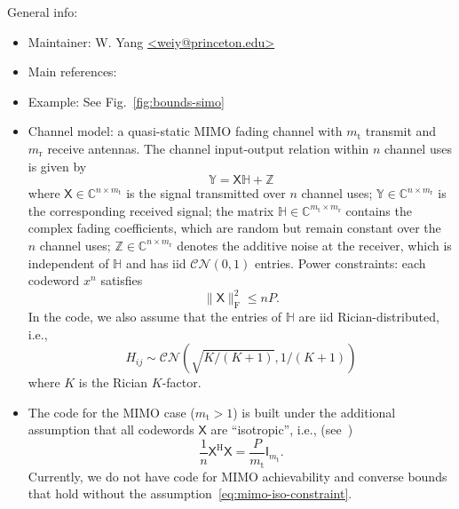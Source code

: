 \documentclass[a4paper,11p]{memoir}
\def\txant{m_{\mathrm{t}}} %
\def\rxant{m_{\mathrm{r}}} %
\def\bl{n} %
\def\complexset{\mathbb{C}}
\begin{document}
General info:
\begin{itemize}
\item Maintainer: W. Yang \url{<weiy@princeton.edu>}

\item Main references: \cite{yang14-07a}

\item Example: See Fig.~\ref{fig:bounds-simo}

\item Channel model: a quasi-static MIMO fading channel with $\txant$ transmit and $\rxant$ receive antennas. The channel input-output relation within $\bl$ channel uses is given by 
\begin{equation}
\mathbb{Y} = \mathsf{X}\mathbb{H} + \mathbb{Z}
\end{equation}
where $\mathsf{X} \in\complexset^{\bl\times\txant}$ is the signal transmitted over $\bl$ channel uses; $\mathbb{Y} \in \complexset^{\bl\times\rxant}$ is the corresponding received signal; the matrix $\mathbb{H}\in\complexset^{\txant\times\rxant}$ contains the complex fading coefficients, which are random but remain constant over the~$\bl$ channel uses;
%
 $\mathbb{Z} \in \complexset^{\bl\times\rxant}$ denotes the additive noise at the receiver, which is independent of $\mathbb{H}$ and has iid $\mathcal{CN} (0,1)$ entries. 
	Power constraints: each codeword $x^n$ satisfies
			$$ \|\mathsf{X} \|_{\mathrm{F}}^2 \le n P .$$
In the code, we also assume that  the entries of $\mathbb{H}$ are iid Rician-distributed, i.e., 
$$H_{ij} \sim \mathcal{CN} (\sqrt{K/(K+1)}, 1/(K+1))$$
where $K$ is the Rician $K$-factor. 

\item The code for the MIMO case ($\txant>1$) is built under the additional assumption that all codewords $\mathsf{X}$ are ``isotropic'', i.e.,  (see~\cite[Sec.~III]{yang14-07a})
\begin{equation}
\label{eq:mimo-iso-constraint}
 \frac{1}{\bl} \mathsf{X}^{\mathrm{H}} \mathsf{X} = \frac{P}{\txant} \mathsf{I}_{\txant}.
 \end{equation}
Currently, we do not have code for MIMO achievability and converse bounds that hold without the assumption~\eqref{eq:mimo-iso-constraint}.



\end{itemize}
\end{document}
